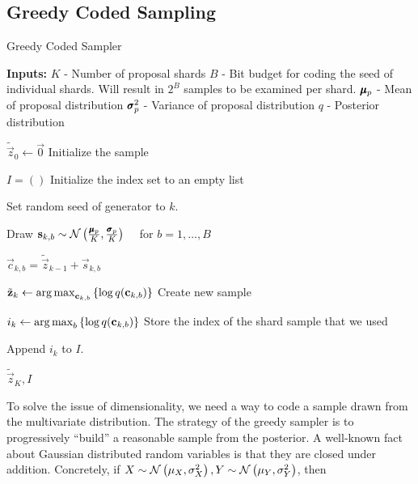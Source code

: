\subsection{Greedy Coded Sampling}
\begin{algorithm}
  \caption{Greedy Coded Sampler}
  \label{alg:greedy_sampler}
  \begin{algorithmic}
    \State \textbf{Inputs:}
    \State $K$ - Number of proposal shards
    \State $B$ - Bit budget for coding the seed of individual shards. 
    \State Will result in $2^B$ samples to be examined per shard.
    \State $\pmb{\mu}_p$ - Mean of proposal distribution
    \State $\pmb{\sigma}_p^2$ - Variance of proposal distribution
    \State $q$ - Posterior distribution
    \Statex

    \State $\tilde{\vec{z}}_0 \gets \vec{0}$
    \Comment Initialize the sample

    \State $I = ()$
    \Comment Initialize the index set to an empty list

    \State Set random seed of generator to $k$.
    
    \State Draw $\mathbf{s}_{k, b} \sim \mathcal{N}\left( \frac{\pmb{\mu}_p}{K}, \frac{\pmb{\sigma}_p}{K} \right)
    \quad$ for $b = 1,\hdots,B$
    
    \State $\vec{c}_{k, b} = \tilde{\vec{z}}_{k - 1} + \vec{s}_{k, b}$

    \State $\tilde{\mathbf{z}}_k \gets \operatorname*{arg\,max}_{\mathbf{c}_{k, b}} \left\{ \log q(\mathbf{c}_{k, b}) \right\}$
    \Comment Create new sample

    \State $i_k \gets \operatorname*{arg\,max}_{b} \left\{ \log q(\mathbf{c}_{k, b}) \right\}$
    \Comment Store the index of the shard sample that we used

    \State Append $i_k$ to $I$.
    
    \EndFor

    \State \Return $\tilde{\vec{z}}_K, I$
    
    \EndProcedure
  \end{algorithmic}
\end{algorithm}
\par
To solve the issue of dimensionality, we need a way to code a sample
drawn from the multivariate distribution. The strategy of the greedy sampler is
to progressively ``build'' a reasonable sample from the posterior. A well-known
fact about Gaussian distributed random variables is that they are
closed under addition. Concretely,
if $X \sim \mathcal{N}\left( \mu_X, \sigma^2_X \right), Y \sim \mathcal{N}\left( \mu_Y, \sigma^2_Y \right)$, then
